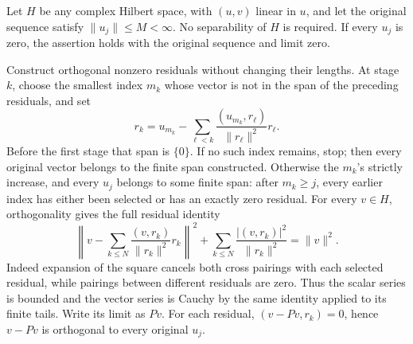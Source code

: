\documentclass[
  11pt,
]{article}
\begin{document}
Let \(H\) be any complex Hilbert space, with \((u,v)\) linear in \(u\),
and let the original sequence satisfy \(\|u_j\|\leq M<\infty\). No
separability of \(H\) is required. If every \(u_j\) is zero, the
assertion holds with the original sequence and limit zero.

Construct orthogonal nonzero residuals without changing their lengths.
At stage \(k\), choose the smallest index \(m_k\) whose vector is not in
the span of the preceding residuals, and set \[
 r_k=u_{m_k}
       -\sum_{\ell<k}\frac{(u_{m_k},r_\ell)}{\|r_\ell\|^2}r_\ell .
                                                               \tag{HS1}
\] Before the first stage that span is \(\{0\}\). If no such index
remains, stop; then every original vector belongs to the finite span
constructed. Otherwise the \(m_k\)'s strictly increase, and every
\(u_j\) belongs to some finite span: after \(m_k\geq j\), every earlier
index has either been selected or has an exactly zero residual. For
every \(v\in H\), orthogonality gives the full residual identity \[
 \left\|v-\sum_{k\leq N}
                \frac{(v,r_k)}{\|r_k\|^2}r_k\right\|^2
       +\sum_{k\leq N}\frac{|(v,r_k)|^2}{\|r_k\|^2}
       =\|v\|^2 .                                               \tag{HS2}
\] Indeed expansion of the square cancels both cross pairings with each
selected residual, while pairings between different residuals are zero.
Thus the scalar series is bounded and the vector series is Cauchy by the
same identity applied to its finite tails. Write its limit as \(P v\).
For each residual, \((v-Pv,r_k)=0\), hence \(v-Pv\) is orthogonal to
every original \(u_j\).
\end{document}
